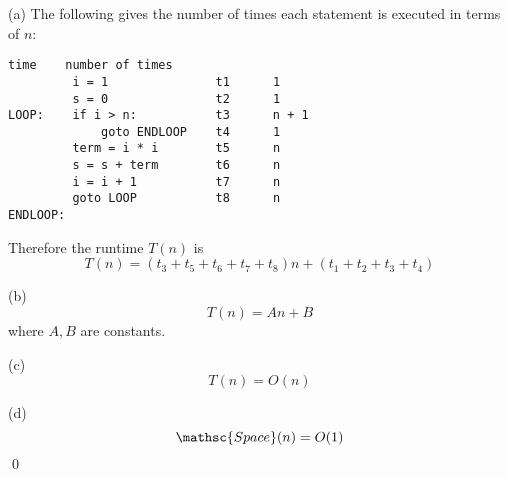 (a) The following gives the number of times each statement is executed
in terms of $n$:
\begin{Verbatim}[frame=single, fontsize=\small]
                             time    number of times 
         i = 1               t1      1
         s = 0               t2      1
LOOP:    if i > n:           t3      n + 1
             goto ENDLOOP    t4      1
         term = i * i        t5      n
         s = s + term        t6      n
         i = i + 1           t7      n
         goto LOOP           t8      n
ENDLOOP:
\end{Verbatim}
Therefore the runtime $T(n)$ is
\[
T(n) = (t_3 + t_5 + t_6 + t_7 + t_8)n + (t_1 + t_2 + t_3 + t_4)
\]

(b)
\[
T(n) = An + B
\]
where $A, B$ are constants.

(c)
\[
T(n) = O(n)
\]

(d)
\[
\mathsc{Space}(n) = O(1)
\]
\qed
